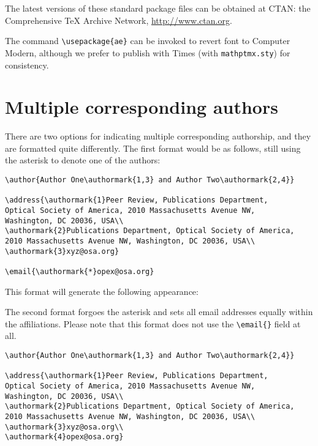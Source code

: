 \documentclass[10pt]{article}
\begin{document}
The latest versions of these standard package files can be obtained at CTAN: the Comprehensive TeX Archive Network, \url{http://www.ctan.org}.

The command \verb+\usepackage{ae}+ can be invoked to revert font to Computer Modern, although we prefer to publish with Times (with \texttt{mathptmx.sty}) for consistency.

\section{Multiple corresponding authors}

There are two options for indicating multiple corresponding authorship, and they are formatted quite differently. The first format would be as follows, still using the asterisk to denote one of the authors:

\begin{verbatim}
\author{Author One\authormark{1,3} and Author Two\authormark{2,4}}

\address{\authormark{1}Peer Review, Publications Department,
Optical Society of America, 2010 Massachusetts Avenue NW,
Washington, DC 20036, USA\\
\authormark{2}Publications Department, Optical Society of America,
2010 Massachusetts Avenue NW, Washington, DC 20036, USA\\
\authormark{3}xyz@osa.org}

\email{\authormark{*}opex@osa.org}
\end{verbatim}

This format will generate the following appearance:\\

\author{Author One and Author Two}

\address{Peer Review, Publications Department,
Optical Society of America, 2010 Massachusetts Avenue NW,
Washington, DC 20036, USA\\
Publications Department, Optical Society of America,
2010 Massachusetts Avenue NW, Washington, DC 20036, USA\\
xyz@osa.org}

\medskip
The second format forgoes the asterisk and sets all email addresses equally within the affiliations. Please note that this format does not use the \verb+\email{}+ field at all.
\begin{verbatim}
\author{Author One\authormark{1,3} and Author Two\authormark{2,4}}

\address{\authormark{1}Peer Review, Publications Department,
Optical Society of America, 2010 Massachusetts Avenue NW,
Washington, DC 20036, USA\\
\authormark{2}Publications Department, Optical Society of America,
2010 Massachusetts Avenue NW, Washington, DC 20036, USA\\
\authormark{3}xyz@osa.org\\
\authormark{4}opex@osa.org}
\end{verbatim}
\end{document}
